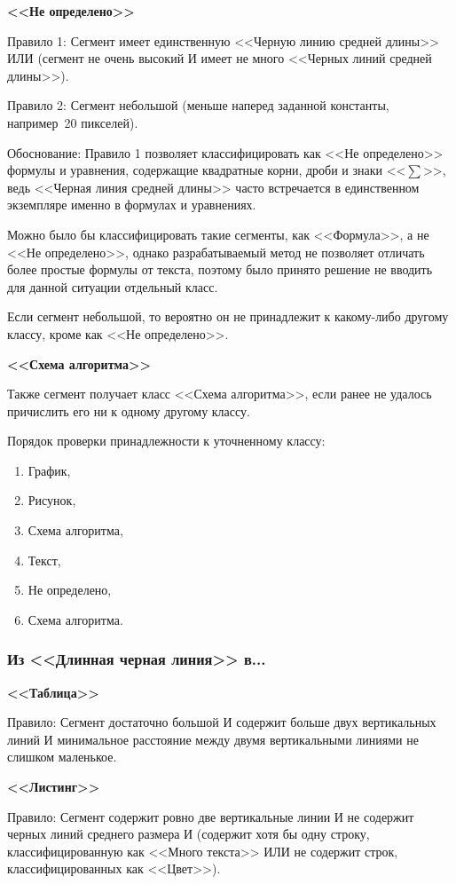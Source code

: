 \textbf{<<Не определено>>}

Правило 1: Сегмент имеет единственную <<Черную линию средней длины>> ИЛИ (сегмент не очень высокий И имеет не много <<Черных линий средней длины>>).

Правило 2: Сегмент небольшой (меньше наперед заданной константы, например~20 пикселей).

Обоснование: Правило 1 позволяет классифицировать как <<Не определено>> формулы и уравнения, содержащие квадратные корни, дроби и знаки <<$\sum$>>, ведь <<Черная линия средней длины>> часто встречается в единственном экземпляре именно в формулах и уравнениях.

Можно было бы классифицировать такие сегменты, как <<Формула>>, а не <<Не определено>>, однако разрабатываемый метод не позволяет отличать более простые формулы от текста, поэтому было принято решение не вводить для данной ситуации отдельный класс.

Если сегмент небольшой, то вероятно он не принадлежит к какому-либо другому классу, кроме как <<Не определено>>.

\textbf{<<Схема алгоритма>>}

Также сегмент получает класс <<Схема алгоритма>>, если ранее не удалось причислить его ни к одному другому классу.

Порядок проверки принадлежности к уточненному классу:
\begin{enumerate}
    \item График,
    \item Рисунок,
    \item Схема алгоритма,
    \item Текст,
    \item Не определено,
    \item Схема алгоритма.
\end{enumerate}

\subsubsection*{Из <<Длинная черная линия>> в...}

\textbf{<<Таблица>>}

Правило: Сегмент достаточно большой И содержит больше двух вертикальных линий И минимальное расстояние между двумя вертикальными линиями не слишком маленькое.

\textbf{<<Листинг>>}

Правило: Сегмент содержит ровно две вертикальные линии И не содержит черных линий среднего размера И (содержит хотя бы одну строку, классифицированную как <<Много текста>> ИЛИ не содержит строк, классифицированных как <<Цвет>>).


